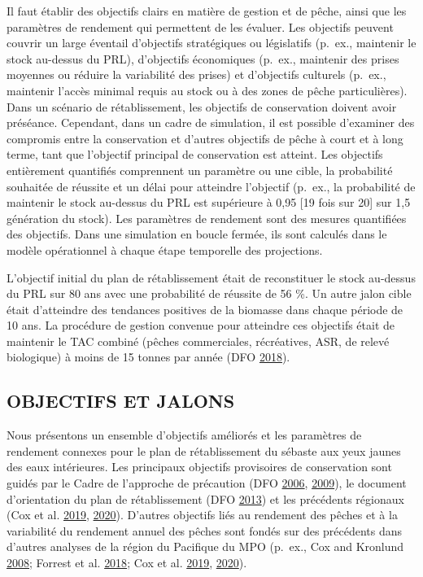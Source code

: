 \documentclass[11pt]{book}
\begin{document}
Il faut établir des objectifs clairs en matière de gestion et de pêche, ainsi que les paramètres de rendement qui permettent de les évaluer. Les objectifs peuvent couvrir un large éventail d'objectifs stratégiques ou législatifs (p.~ex., maintenir le stock au-dessus du PRL), d'objectifs économiques (p.~ex., maintenir des prises moyennes ou réduire la variabilité des prises) et d'objectifs culturels (p.~ex., maintenir l'accès minimal requis au stock ou à des zones de pêche particulières). Dans un scénario de rétablissement, les objectifs de conservation doivent avoir préséance. Cependant, dans un cadre de simulation, il est possible d'examiner des compromis entre la conservation et d'autres objectifs de pêche à court et à long terme, tant que l'objectif principal de conservation est atteint. Les objectifs entièrement quantifiés comprennent un paramètre ou une cible, la probabilité souhaitée de réussite et un délai pour atteindre l'objectif (p.~ex., la probabilité de maintenir le stock au-dessus du PRL est supérieure à 0,95 {[}19 fois sur 20{]} sur 1,5 génération du stock). Les paramètres de rendement sont des mesures quantifiées des objectifs. Dans une simulation en boucle fermée, ils sont calculés dans le modèle opérationnel à chaque étape temporelle des projections.

L'objectif initial du plan de rétablissement était de reconstituer le stock au-dessus du PRL sur 80 ans avec une probabilité de réussite de 56 \%. Un autre jalon cible était d'atteindre des tendances positives de la biomasse dans chaque période de 10 ans. La procédure de gestion convenue pour atteindre ces objectifs était de maintenir le TAC combiné (pêches commerciales, récréatives, ASR, de relevé biologique) à moins de 15 tonnes par année (DFO \protect\hyperlink{ref-ifmp2018}{2018}).

\hypertarget{sec:objectives-metrics-obj}{%
\subsection{OBJECTIFS ET JALONS}\label{sec:objectives-metrics-obj}}

Nous présentons un ensemble d'objectifs améliorés et les paramètres de rendement connexes pour le plan de rétablissement du sébaste aux yeux jaunes des eaux intérieures. Les principaux objectifs provisoires de conservation sont guidés par le Cadre de l'approche de précaution (DFO \protect\hyperlink{ref-dfo2006}{2006}, \protect\hyperlink{ref-dfo2009}{2009}), le document d'orientation du plan de rétablissement (DFO \protect\hyperlink{ref-dfo2013}{2013}) et les précédents régionaux (Cox et al. \protect\hyperlink{ref-cox2019}{2019}, \protect\hyperlink{ref-cox2020}{2020}). D'autres objectifs liés au rendement des pêches et à la variabilité du rendement annuel des pêches sont fondés sur des précédents dans d'autres analyses de la région du Pacifique du MPO (p.~ex., Cox and Kronlund \protect\hyperlink{ref-cox2008a}{2008}; Forrest et al. \protect\hyperlink{ref-forrest2018}{2018}; Cox et al. \protect\hyperlink{ref-cox2019}{2019}, \protect\hyperlink{ref-cox2020}{2020}).
\end{document}
